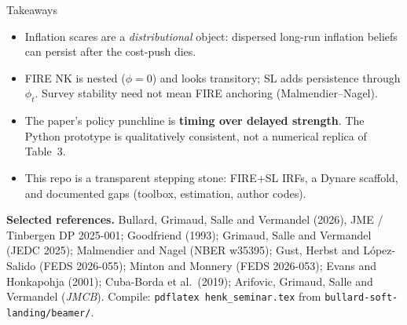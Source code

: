 \documentclass[11pt,aspectratio=169]{beamer}
\begin{document}
\begin{frame}{Takeaways}
  \begin{itemize}
    \item Inflation scares are a \emph{distributional} object: dispersed
          long-run inflation beliefs can persist after the cost-push dies.
    \item FIRE NK is nested ($\phi=0$) and looks transitory; SL adds
          persistence through $\phi_t$. Survey stability need not mean
          FIRE anchoring (Malmendier--Nagel).
    \item The paper's policy punchline is \textbf{timing over delayed
          strength}. The Python prototype is qualitatively consistent,
          not a numerical replica of Table~3.
    \item This repo is a transparent stepping stone: FIRE+SL IRFs,
          a Dynare scaffold, and documented gaps
          (toolbox, estimation, author codes).
  \end{itemize}
  \vfill
  {\scriptsize
  \textbf{Selected references.}
  Bullard, Grimaud, Salle and Vermandel (2026), JME / Tinbergen DP 2025-001;
  Goodfriend (1993);
  Grimaud, Salle and Vermandel (JEDC 2025);
  Malmendier and Nagel (NBER w35395);
  Gust, Herbst and L\'opez-Salido (FEDS 2026-055);
  Minton and Monnery (FEDS 2026-053);
  Evans and Honkapohja (2001);
  Cuba-Borda et al.\ (2019);
  Arifovic, Grimaud, Salle and Vermandel (\emph{JMCB}).
  Compile: \texttt{pdflatex henk\_seminar.tex} from
  \texttt{bullard-soft-landing/beamer/}.}
\end{frame}
\end{document}
